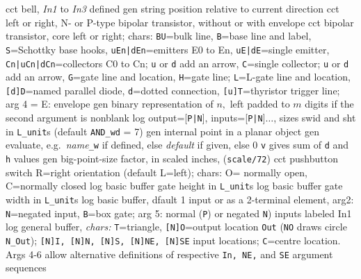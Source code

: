   {cct}
  {bell, {\sl In1} to {\sl In3} defined
   }
  {gen}
  {string position relative to current direction}
  {cct}
  {left or right, N- or P-type bipolar transistor, without or with envelope 
    }
  {cct}
  { bipolar transistor, core left or right; chars:
   {\tt BU}=bulk line,
   {\tt B}=base line and label,
   {\tt S}=Schottky base hooks,
   {\tt uEn|dEn}=emitters E0 to En,
   {\tt uE|dE}=single emitter,
   {\tt Cn|uCn|dCn}=collectors C0 to Cn; {\tt u} or {\tt d} add an arrow,
   {\tt C}=single collector; {\tt u} or {\tt d} add an arrow,
   {\tt G}=gate line and location,
   {\tt H}=gate line; {\tt L}=L-gate line and location,
   {\tt [d]D}=named parallel diode,
   {\tt d}=dotted connection,
   {\tt [u]T}=thyristor trigger line;
   arg 4 = E: envelope
    }
  {gen}
  {binary representation of $n,$ left padded to $m$ digits if the second
   argument is nonblank}
  {log}
  {output=[{\tt P|N}], inputs=[{\tt P|N}]$\ldots$, sizes swid and sht
  in {\tt L\_unit}s (default {\tt AND\_wd} = 7)
    }
  {gen}
  {internal point in a planar object}
  {gen}
  {evaluate, e.g.\ {\sl name}{\tt \_w} if defined, else {\sl default\/}
   if given, else 0 {\tt v} gives sum of {\tt d} and {\tt h} values
     }
  {gen}
  {big-point-size factor, in scaled inches, ({\tt *scale/72})}
  {cct}
  {pushbutton switch R=right orientation (default L=left);
     chars: O= normally open, C=normally closed }
  {log}
  {basic buffer gate height in {\tt L\_unit}s}
  {log}
  {basic buffer gate width in {\tt L\_unit}s}
  {log}
  {basic buffer, dfault 1 input or as a 2-terminal element,
    arg2: {\tt N}=negated input, {\tt B}=box gate; arg 5:
    normal ({\tt P}) or negated {\tt N}) inputs labeled In1 
    }
  {log}
  {general buffer, {\sl chars:} {\tt T}=triangle,
            {\tt [N]O}=output location {\tt Out}
            ({\tt NO} draws circle {\tt N\_Out});
            {\tt [N]I, [N]N, [N]S, [N]NE, [N]SE}
            input locations; {\tt C}=centre location.
            Args 4-6 allow alternative
            definitions of respective {\tt In, NE,}
            and {\tt SE} argument sequences }
